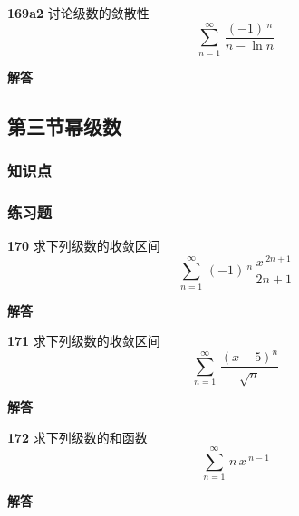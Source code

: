 \documentclass[a4paper,10pt]{article} %
\begin{document}

\textheight


\par\noindent \textbf{169a2} \quad 讨论级数的敛散性
$$\sum_{n=1}^{\infty} \,\frac{(-1)\,^n }{n-\ln n}$$
\par\noindent \textbf{ 解答}




\textheight

\newpage
\subsection{第三节\quad 幂级数}
\subsubsection{知识点}
\subsubsection{练习题}
\par\noindent \textbf{170} \quad 求下列级数的收敛区间
$$\sum_{n=1}^{\infty} \,(-1)\,^n \,\frac{x\,^{2n+1}}{2n+1}$$
\par\noindent \textbf{ 解答}




\textheight


\par\noindent \textbf{171} \quad 求下列级数的收敛区间
$$\sum_{n=1}^{\infty} \,\frac{(x-5)^n}{\sqrt{n}}$$
\par\noindent \textbf{ 解答}




\textheight


\par\noindent \textbf{172} \quad 求下列级数的和函数
$$\sum_{n=1}^{\infty} \,n\,x\,^{n-1}$$
\par\noindent \textbf{ 解答}
\end{document}
